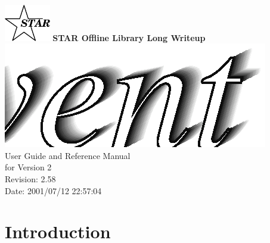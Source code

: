 \documentclass[twoside]{article}
\begin{document}
%
%
\begin{titlepage}
\pagestyle{empty}
\vspace*{-25mm}
\begin{center}
  \mbox{\includegraphics[width=2cm]{StarIcon.eps}}
  {\Large\bf STAR Offline Library Long Writeup}
  \hfill\mbox{}\\[3cm]
  \mbox{\includegraphics[width=\textwidth]{StEventTitle.eps}}
  \hfill\mbox{}\\[3cm]
  {\LARGE User Guide and Reference Manual \\[5mm] for Version 2}\\[2cm]
  {\LARGE $ $Revision: 2.58 $ $}  \\[5mm] %
  {\LARGE $ $Date: 2001/07/12 22:57:04 $ $}  %
  \vfill
\end{center}
\cleardoublepage
\end{titlepage}

%
%
\tableofcontents
\cleardoublepage

%
%

\section{Introduction} %
\end{document}
